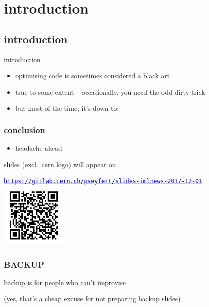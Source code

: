 \documentclass[table,xcolor=dvipsnames,professionalfonts]{beamer}
\author[Paul]{Paul Seyfert}
\institute[CERN]{}
\date[\today]{}
\title{\myhref{https://github.com/pseyfert/tmva-branch-adder}{tmva-branch-adder}}
\newcommand{\myhref}[2]{\href{#1}{\footnotesize{\textcolor{blue}{\texttt{#2}}}}}
\begin{document}
\maketitle

\section{introduction}
\subsection{introduction}
\begin{frame}{introduction}
\begin{itemize}
\item optimising code is sometimes considered a black art
\item true to some extent -- occasionally, you need the odd dirty trick
\item but most of the time, it's down to:
\end{itemize}
\end{frame}
\begin{frame}
  \frametitle{conclusion}
  
  \begin{itemize}
      \item headache ahead
  \end{itemize}

  \vspace{.3\textheight}

  \footnotesize{slides (excl.\ cern logo) will appear on}


  \myhref{https://gitlab.cern.ch/pseyfert/slides-imlnews-2017-12-01}{https://gitlab.cern.ch/pseyfert/slides-imlnews-2017-12-01}\includegraphics[width=.2\textwidth]{./QR2.png}
\end{frame}

\appendix

\begin{frame}
  \frametitle{BACKUP}
  backup is for people who can't improvise

  (yes, that's a cheap excuse for not preparing backup slides)
\end{frame}
\end{document}
